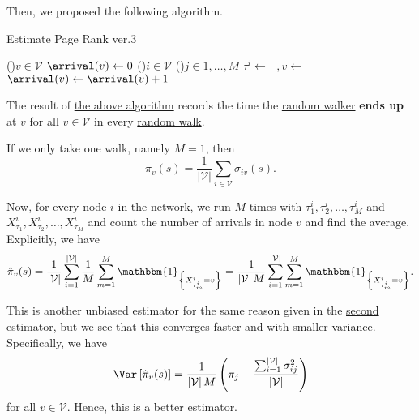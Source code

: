 Then, we proposed the following algorithm.

\begin{algorithm}[H]\label{algo:Monte-Carlo-algorithm-3}
	\DontPrintSemicolon{}
	\caption{Estimate Page Rank ver.3}

	\BlankLine

	\For(){\(v\in \mathcal{V} \)}{
		\(\arrival(v)\gets 0\)\;
	}
	\;
	\For(){\(i\in \mathcal{V}\)}{
		\For(){\(j\in 1, \dots, M\)}{
			\(\tau^i \gets \) 
			\(\_, v \gets\)
			\(\arrival(v)\gets \arrival(v) + 1\)
		}
	}
	\Return{\arrival}\;
\end{algorithm}
\begin{note}
	The result of \hyperref[algo:Monte-Carlo-algorithm-3]{the above algorithm} records the time the \hyperref[def:random-walker]{random walker}
	\textbf{ends up} at \(v\) for all \(v\in \mathcal{V} \) in every \hyperref[algo:random-walk-algorithm]{random walk}.
\end{note}

If we only take one walk, namely \(M = 1\), then
\[
	\pi_v(s) = \frac{1}{\left\vert \mathcal{V}  \right\vert }\sum\limits_{i\in\mathcal{V}}\sigma_{iv}(s).
\]

Now, for every node \(i\) in the network, we run \(M\) times with \(\tau^i_1, \tau^i_2, \dots , \tau^i_M\) and \(X_{\tau_1}^i, X_{\tau_2}^i, \dots , X_{\tau_M}^i\) and count the number of arrivals in node \(v\) and find the average. Explicitly, we have
\[
	\hat{\pi}_v(s)
	= \frac{1}{\left\vert \mathcal{V} \right\vert}\sum\limits_{i=1}^{\left\vert \mathcal{V}\right\vert} \frac{1}{M}\sum\limits_{m=1}^{M} \mathbbm{1}_{\left\{X^i_{\tau^i_m} = v\right\}}
	= \frac{1}{\left\vert \mathcal{V}  \right\vert M}\sum\limits_{i=1}^{\left\vert \mathcal{V} \right\vert} \sum\limits_{m=1}^{M} \mathbbm{1}_{\left\{X^i_{\tau^i_m} = v\right\}}.
\]

This is another unbiased estimator for the same reason given in the \hyperref[subsec:second-page-rank-estimator]{second estimator}, but we see that this converges faster and with smaller variance. Specifically, we have
\[
	\Var\left[\hat{\pi}_v(s) \right]  = \frac{1}{\left\vert \mathcal{V}  \right\vert M}\left(\pi_{j} - \frac{\sum_{i=1}^{\left\vert \mathcal{V}  \right\vert} \sigma_{ij}^2}{\left\vert \mathcal{V}  \right\vert}\right)
\]
for all \(v\in \mathcal{V} \). Hence, this is a better estimator.

